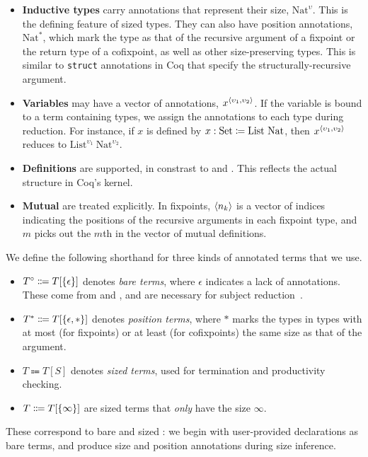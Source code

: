 \begin{itemize}
    \item \textbf{Inductive types} carry annotations that represent their size, \eg $\text{Nat}^\upsilon$.
      This is the defining feature of sized types.
      They can also have position annotations, \eg $\text{Nat}^*$, which mark the type as that of the recursive argument of a fixpoint or the return type of a cofixpoint, as well as other size-preserving types.
      This is similar to \texttt{struct} annotations in Coq that specify the structurally-recursive argument.
    \item \textbf{Variables} may have a vector of annotations, \eg $x^{\langle\upsilon_1, \upsilon_2\rangle}$.
      If the variable is bound to a term containing \coinductive types, we assign the annotations to each \coinductive type during reduction.
      For instance, if $x$ is defined by $x : \text{Set} \coloneqq \text{List} ~ \text{Nat}$, then $x^{\langle\upsilon_1, \upsilon_2\rangle}$ reduces to $\text{List}^{\upsilon_1} ~ \text{Nat}^{\upsilon_2}$.
    \item \textbf{Definitions} are supported, in constrast to \CIChat and \CIChatminus. This reflects the actual structure in Coq's kernel.
    \item \textbf{Mutual \cofixpoints} are treated explicitly.
      In fixpoints, $\langle n_k\rangle$ is a vector of indices indicating the positions of the recursive arguments in each fixpoint type, and $m$ picks out the $m$th \cofixpoint in the vector of mutual definitions.
\end{itemize}

\iffalse %
The simplicity of the size algebra of $S$, with only the successor operation $\succ{\cdot}$, allows for easy and efficient size inference.
We elaborate on this in \autoref{sec:algorithm}.
\fi

We define the following shorthand for three kinds of annotated terms that we use.
\begin{itemize}
  \item $T^\circ \Coloneqq T[\{\epsilon\}]$ denotes \textit{bare terms}, where $\epsilon$ indicates a lack of annotations.
    These come from \CIChatminus and \CIChat, and are necessary for subject reduction~\cite{cic-hat-minus}.
  \item $T^\ast \Coloneqq T[\{\epsilon, \ast\}]$ denotes \textit{position terms}, where $\ast$ marks the types in \cofixpoint types with at most (for fixpoints) or at least (for cofixpoints) the same size as that of the \corecursive argument.
  \item $T \Coloneqq T[S]$ denotes \textit{sized terms}, used for termination and productivity checking.
  \item $T \Coloneqq T[\{\infty\}]$ are sized terms that \emph{only} have the size $\infty$.
\end{itemize}
These correspond to bare and sized \lang: we begin with user-provided declarations as bare terms, and produce size and position annotations during size inference.

